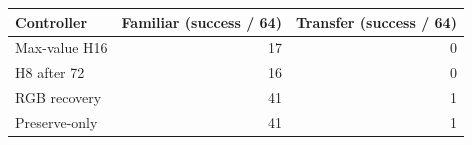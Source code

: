 \begin{tabular}{lrr}
\toprule
Controller & Familiar (success / 64) & Transfer (success / 64) \\
\midrule
Max-value H16 & 17 & 0 \\
H8 after 72 & 16 & 0 \\
RGB recovery & 41 & 1 \\
Preserve-only & 41 & 1 \\
\bottomrule
\end{tabular}
